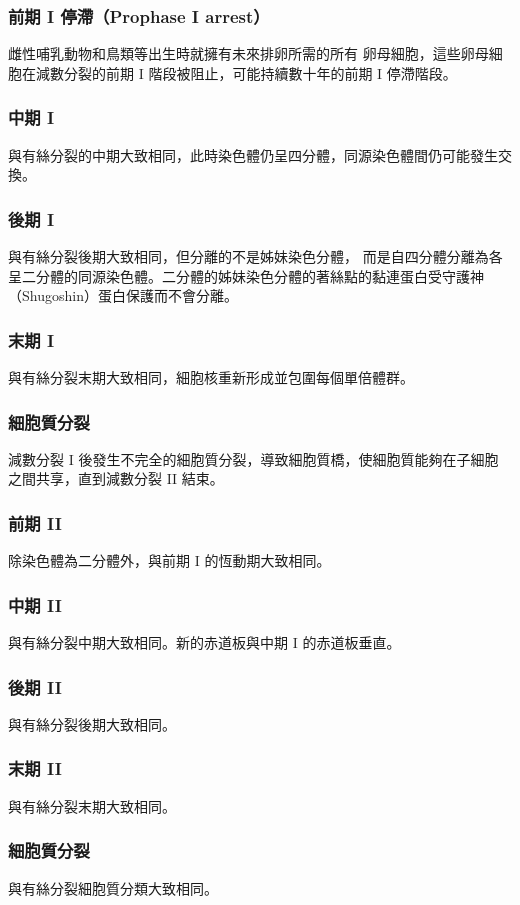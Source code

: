 \documentclass[a4paper,12pt]{report}
\begin{document}
\subsubsection{前期 I 停滯（Prophase I arrest）}
雌性哺乳動物和鳥類等出生時就擁有未來排卵所需的所有 卵母細胞，這些卵母細胞在減數分裂的前期 I 階段被阻止，可能持續數十年的前期 I 停滯階段。
\subsubsection{中期 I }
與有絲分裂的中期大致相同，此時染色體仍呈四分體，同源染色體間仍可能發生交換。
\subsubsection{後期 I }
與有絲分裂後期大致相同，但分離的不是姊妹染色分體， 而是自四分體分離為各呈二分體的同源染色體。二分體的姊妹染色分體的著絲點的黏連蛋白受守護神（Shugoshin）蛋白保護而不會分離。
\subsubsection{末期 I }
與有絲分裂末期大致相同，細胞核重新形成並包圍每個單倍體群。
\subsubsection{細胞質分裂}
減數分裂 I 後發生不完全的細胞質分裂，導致細胞質橋，使細胞質能夠在子細胞之間共享，直到減數分裂 II 結束。
\subsubsection{前期 II }
除染色體為二分體外，與前期 I 的恆動期大致相同。
\subsubsection{中期 II }
與有絲分裂中期大致相同。新的赤道板與中期 I 的赤道板垂直。
\subsubsection{後期 II }
與有絲分裂後期大致相同。
\subsubsection{末期 II }
與有絲分裂末期大致相同。
\subsubsection{細胞質分裂}
與有絲分裂細胞質分類大致相同。
\end{document}
